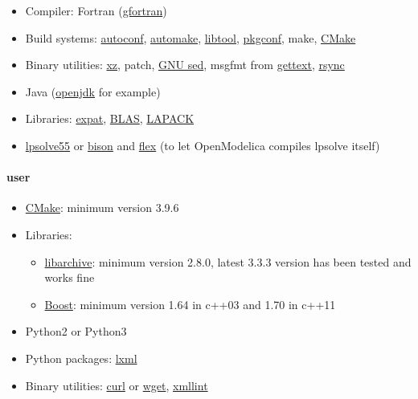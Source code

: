 \documentclass[a4paper, 12pt]{report}
\begin{document}
\begin{itemize}
\item
  Compiler: Fortran (\href{https://gcc.gnu.org/fortran/}{gfortran})
\item
  Build systems:
  \href{https://www.gnu.org/software/autoconf/}{autoconf},
  \href{https://www.gnu.org/software/autoconf/}{automake},
  \href{https://www.gnu.org/software/libtool/}{libtool},
  \href{http://pkgconf.org/}{pkgconf}, make,
  \href{https://cmake.org/}{CMake}
\item
  Binary utilities: \href{https://tukaani.org/xz/}{xz}, patch,
  \href{https://www.gnu.org/software/sed/}{GNU sed}, msgfmt from
  \href{https://www.gnu.org/software/gettext/}{gettext},
  \href{https://rsync.samba.org/}{rsync}
\item
  Java (\href{https://openjdk.java.net/}{openjdk} for example)
\item
  Libraries: \href{https://libexpat.github.io/}{expat},
  \href{http://www.netlib.org/blas/index.html}{BLAS},
  \href{http://www.netlib.org/lapack/index.html}{LAPACK}
\item
  \href{http://lpsolve.sourceforge.net/}{lpsolve55} or
  \href{https://www.gnu.org/software/bison/}{bison} and
  \href{https://www.gnu.org/software/flex/}{flex} (to let OpenModelica
  compiles lpsolve itself)
\end{itemize}

\paragraph{\Dynawo user}

\begin{itemize}
\item
  \href{https://cmake.org/}{CMake}: minimum version 3.9.6
\item
  Libraries:

  \begin{itemize}
  \item
    \href{https://www.libarchive.org/}{libarchive}: minimum version
    2.8.0, latest 3.3.3 version has been tested and works fine
  \item
    \href{https://www.boost.org/}{Boost}: minimum version 1.64 in c++03 and 1.70 in c++11
  \end{itemize}

\item
  Python2 or Python3
\item
  Python packages: \href{https://lxml.de/}{lxml}
\item
  Binary utilities: \href{https://curl.haxx.se/}{curl} or
  \href{https://www.gnu.org/software/wget/}{wget},
  \href{http://xmlsoft.org/xmllint.html}{xmllint}
\end{itemize}
\end{document}
